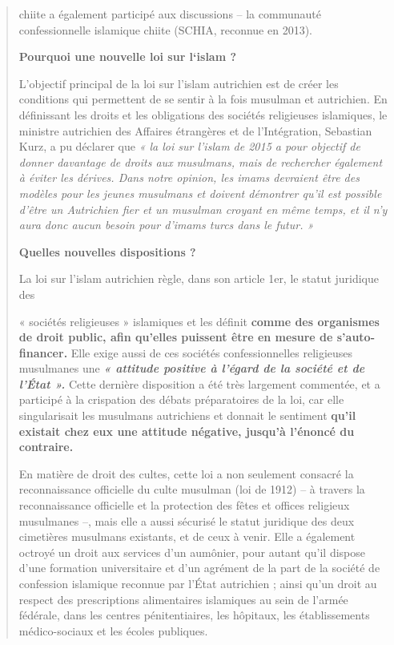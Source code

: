 \begin{quote}
chiite a également participé aux discussions -- la communauté
confessionnelle islamique chiite (SCHIA, reconnue en 2013).

\textbf{Pourquoi une nouvelle loi sur l`islam ?}

L'objectif principal de la loi sur l'islam autrichien est de créer les
conditions qui permettent de se sentir à la fois musulman et autrichien.
En définissant les droits et les obligations des sociétés religieuses
islamiques, le ministre autrichien des Affaires étrangères et de
l'Intégration, Sebastian Kurz, a pu déclarer que \emph{« la loi sur
l'islam de 2015 a pour objectif de donner davantage de droits aux
musulmans, mais de rechercher également à éviter les dérives. Dans notre
opinion, les imams devraient être des modèles pour les jeunes musulmans
et doivent démontrer qu'il est possible d'être un Autrichien fier et un
musulman croyant en même temps, et il n'y aura donc aucun besoin pour
d'imams turcs dans le futur. »}

\textbf{Quelles nouvelles dispositions ?}

La loi sur l'islam autrichien règle, dans son article 1er, le statut
juridique des

« sociétés religieuses » islamiques et les définit \textbf{comme des
organismes de droit public, afin qu'elles puissent être en mesure de
s'auto-financer.} Elle exige aussi de ces sociétés confessionnelles
religieuses musulmanes une \emph{\textbf{« attitude positive à l'égard
de la société et de l'État ».}} Cette dernière disposition a été très
largement commentée, et a participé à la crispation des débats
préparatoires de la loi, car elle singularisait les musulmans
autrichiens et donnait le sentiment \textbf{qu'il existait chez eux une
attitude négative, jusqu'à l'énoncé du contraire.}

En matière de droit des cultes, cette loi a non seulement consacré la
reconnaissance officielle du culte musulman (loi de 1912) -- à travers
la reconnaissance officielle et la protection des fêtes et offices
religieux musulmanes --, mais elle a aussi sécurisé le statut juridique
des deux cimetières musulmans existants, et de ceux à venir. Elle a
également octroyé un droit aux services d'un aumônier, pour autant qu'il
dispose d'une formation universitaire et d'un agrément de la part de la
société de confession islamique reconnue par l'État autrichien ; ainsi
qu'un droit au respect des prescriptions alimentaires islamiques au sein
de l'armée fédérale, dans les centres pénitentiaires, les hôpitaux, les
établissements médico-sociaux et les écoles publiques.
\end{quote}

